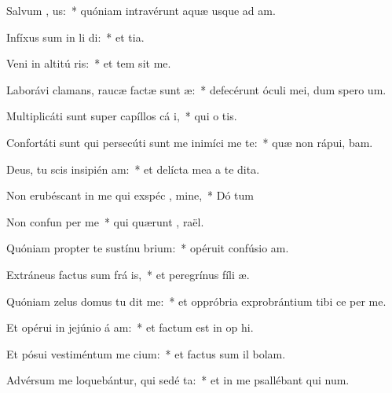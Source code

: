 \item Salvum  , us:~* quóniam intravérunt aquæ usque ad  am.
\item Infíxus sum in li di:~* et   tia.
\item Veni in altitú ris:~* et tem sit me.
\item Laborávi clamans, raucæ factæ sunt  æ:~* defecérunt óculi mei, dum spero   um.
\item Multiplicáti sunt super capíllos cá i,~* qui o  tis.
\item Confortáti sunt qui persecúti sunt me inimíci me te:~* quæ non rápui,  bam.
\item Deus, tu scis insipién am:~* et delícta mea a te   dita.
\item Non erubéscant in me qui exspéc , mine,~* Dó tum
\item Non confun per me~* qui quærunt ,  raël.
\item Quóniam propter te sustínu brium:~* opéruit confúsio  am.
\item Extráneus factus sum frá is,~* et peregrínus fíli  æ.
\item Quóniam zelus domus tu dit me:~* et oppróbria exprobrántium tibi ce per me.
\item Et opérui in jejúnio á am:~* et factum est in op hi.
\item Et pósui vestiméntum me cium:~* et factus sum il  bolam.
\item Advérsum me loquebántur, qui sedé  ta:~* et in me psallébant qui  num.
